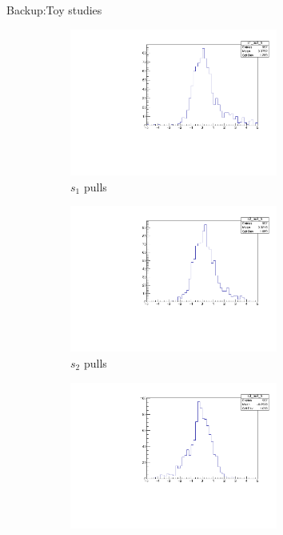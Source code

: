 \documentclass{beamer}
\begin{document}
\begin{frame}{Backup:Toy studies}
  \begin{figure}
    \centering
    \begin{subfigure}{0.5\textwidth}
      \centering
      \includegraphics[width=0.75\textwidth]{Plots/s1_ToyFits_pull.pdf}
      \caption{$s_1$ pulls}
    \end{subfigure}%
    \begin{subfigure}{0.5\textwidth}
      \centering
      \includegraphics[width=0.75\textwidth]{Plots/s2_ToyFits_pull.pdf}
      \caption{$s_2$ pulls}
    \end{subfigure}
    \begin{subfigure}{0.5\textwidth}
      \centering
      \includegraphics[width=0.75\textwidth]{Plots/s3_ToyFits_pull.pdf}

\end{subfigure}
\end{figure}
\end{frame}
\end{document}
